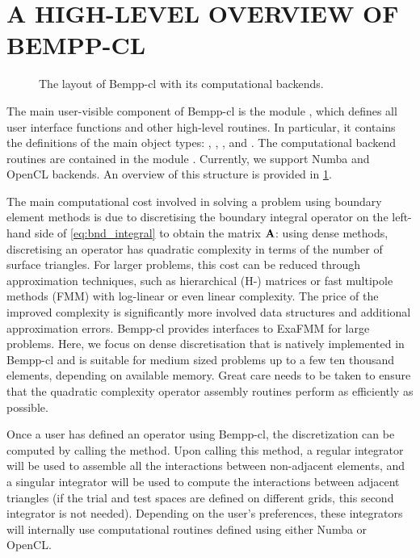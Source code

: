 \section{A HIGH-LEVEL OVERVIEW OF BEMPP-CL}

\begin{figure}
  \centering
  
  \caption{The layout of Bempp-cl with its computational backends.}
  \label{fig:overview}
\end{figure}

The main user-visible component of Bempp-cl is the module , which defines all user interface functions and other high-level routines. In particular, it contains the definitions of the main object types: \mbox{,} \mbox{,} \mbox{,} and . The computational backend routines are contained in the module . Currently, we support Numba and OpenCL backends. An overview of this structure is provided in \cref{fig:overview}.

The main computational cost involved in solving a problem using boundary element methods is due to discretising the boundary integral operator on the left-hand side of \cref{eq:bnd_integral} to obtain the matrix $\mathbf{A}$: using dense methods, discretising an operator has quadratic complexity in terms of the number of surface triangles. For larger problems, this cost can be reduced through approximation techniques, such as hierarchical (H-) matrices or fast multipole methods (FMM) with log-linear or even linear complexity. The price of the improved complexity is significantly more involved data structures and additional approximation errors. Bempp-cl provides interfaces to ExaFMM \cite{bempp_exafmm} for large problems. Here, we focus on dense discretisation that is natively implemented in Bempp-cl and is suitable for medium sized problems up to a few ten thousand elements, depending on available memory. Great care needs to be taken to ensure that the quadratic complexity operator assembly routines perform as efficiently as possible.

Once a user has defined an operator using Bempp-cl, the discretization can be computed by calling the  method. Upon calling this method, a regular integrator will be used to assemble all the interactions between non-adjacent elements, and a singular integrator will be used to compute the interactions between adjacent triangles (if the trial and test spaces are defined on different grids, this second integrator is not needed). Depending on the user's preferences, these integrators will internally use computational routines defined using either Numba or OpenCL.

